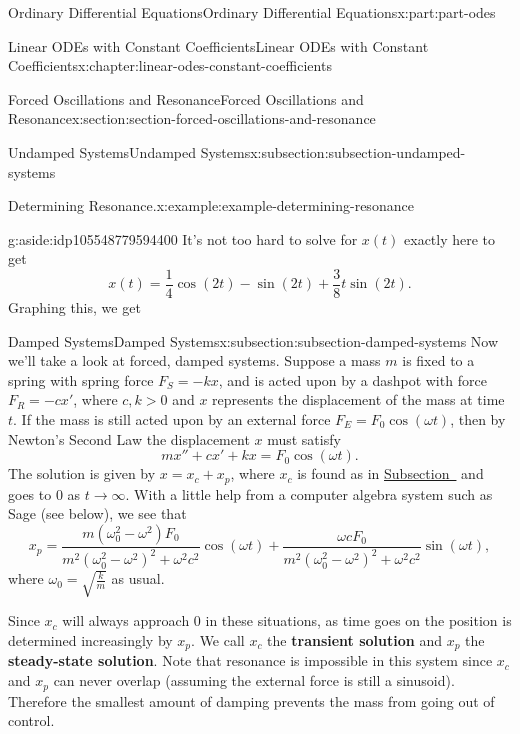 \documentclass[oneside,10pt,]{book}
\newcommand{\terminology}[1]{\textbf{#1}}
\numberwithin{equation}{part}
\newcommand{\gt}{>}
\begin{document}
\begin{partptx}{Ordinary Differential Equations}{}{Ordinary Differential Equations}{}{}{x:part:part-odes}
\begin{chapterptx}{Linear ODEs with Constant Coefficients}{}{Linear ODEs with Constant Coefficients}{}{}{x:chapter:linear-odes-constant-coefficients}
\begin{sectionptx}{Forced Oscillations and Resonance}{}{Forced Oscillations and Resonance}{}{}{x:section:section-forced-oscillations-and-resonance}
\begin{subsectionptx}{Undamped Systems}{}{Undamped Systems}{}{}{x:subsection:subsection-undamped-systems}
\begin{example}{Determining Resonance.}{x:example:example-determining-resonance}
\end{example}
\begin{aside}{}{g:aside:idp105548779594400}%
It's not too hard to solve for \(x(t)\) exactly here to get%
\begin{equation*}
x(t) = \frac{1}{4}\cos(2t) - \sin(2t) + \frac{3}{8}t\sin(2t).
\end{equation*}
Graphing this, we get%
\end{aside}
\end{subsectionptx}
%
%
\typeout{************************************************}
\typeout{************************************************}
%
\begin{subsectionptx}{Damped Systems}{}{Damped Systems}{}{}{x:subsection:subsection-damped-systems}
Now we'll take a look at forced, damped systems. Suppose a mass \(m\) is fixed to a spring with spring force \(F_{S} = -kx\), and is acted upon by a dashpot with force \(F_{R} = -cx'\), where \(c,k \gt 0\) and \(x\) represents the displacement of the mass at time \(t\). If the mass is still acted upon by an external force \(F_{E} = F_{0}\cos(\omega t)\), then by Newton's Second Law the displacement \(x\) must satisfy%
\begin{equation*}
mx'' + cx' + kx = F_{0}\cos(\omega t).
\end{equation*}
The solution is given by \(x = x_{c} + x_{p}\), where \(x_{c}\) is found as in \hyperref[x:subsection:subsection-free-damped-motion]{Subsection~} and goes to \(0\) as \(t\to\infty\). With a little help from a computer algebra system such as Sage (see below), we see that%
\begin{equation*}
x_{p} = \frac{m(\omega_{0}^{2} - \omega^{2})F_{0}}{m^{2}(\omega_{0}^{2} - \omega^{2})^{2} + \omega^{2}c^{2}}\cos(\omega t) + \frac{\omega c F_{0}}{m^{2}(\omega_{0}^{2} - \omega^{2})^{2} + \omega^{2}c^{2}}\sin(\omega t),
\end{equation*}
where \(\omega_{0} = \sqrt{\frac{k}{m}}\) as usual.%
\par
Since \(x_{c}\) will always approach \(0\) in these situations, as time goes on the position is determined increasingly by \(x_{p}\). We call \(x_{c}\) the \terminology{transient solution} and \(x_{p}\) the \terminology{steady-state solution}. Note that resonance is impossible in this system since \(x_{c}\) and \(x_{p}\) can never overlap (assuming the external force is still a sinusoid). Therefore the smallest amount of damping prevents the mass from going out of control.%
\begin{sageinput}

\end{sageinput}
\end{subsectionptx}
\end{sectionptx}
\end{chapterptx}
\end{partptx}
\end{document}
